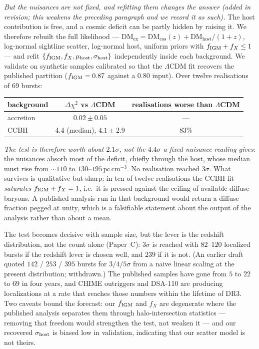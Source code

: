 \documentclass[11pt]{article}
\begin{document}
\emph{But the nuisances are not fixed, and refitting them changes the answer (added in revision;
this weakens the preceding paragraph and we record it as such).} The host contribution is free, and
a cosmic deficit can be partly hidden by raising it. We therefore rebuilt the full likelihood ---
$\mathrm{DM_{ex}} = \mathrm{DM_{cos}}(z) + \mathrm{DM_{host}}/(1+z)$, log-normal sightline scatter,
log-normal host, uniform priors with $f_{\rm IGM}+f_X \leq 1$ --- and refit
$\{f_{\rm IGM}, f_X, \mu_{\rm host}, \sigma_{\rm host}\}$ independently inside each background. We
validate on synthetic samples calibrated so that the $\Lambda$CDM fit recovers the published
partition ($f_{\rm IGM} = 0.87$ against a $0.80$ input). Over twelve realisations of $69$ bursts:
\begin{center}
\begin{tabular}{lcc}
\hline
background & $\Delta\chi^2$ vs $\Lambda$CDM & realisations worse than $\Lambda$CDM \\
\hline
accretion & $0.02 \pm 0.05$ & --- \\
CCBH & $4.4$ (median), $4.1 \pm 2.9$ & $83\%$ \\
\hline
\end{tabular}
\end{center}
\emph{The test is therefore worth about $2.1\sigma$, not the $4.4\sigma$ a fixed-nuisance reading gives}: the nuisances absorb most of
the deficit, chiefly through the host, whose median must rise from $\sim\!110$ to
$130$--$195\,\mathrm{pc\,cm^{-3}}$. No realisation reached $3\sigma$. What survives is qualitative
but sharp: in ten of twelve realisations the CCBH fit \emph{saturates} $f_{\rm IGM}+f_X = 1$, i.e.\
it is pressed against the ceiling of available diffuse baryons. A published analysis run in that
background would return a diffuse fraction pegged at unity, which is a falsifiable statement about
the output of the analysis rather than about a mean.

The test becomes decisive with sample size, but the lever is the redshift distribution, not the count alone (Paper~C): $3\sigma$ is reached with $82$--$120$ localized bursts if the redshift lever is chosen well, and $239$ if it is not. (An earlier draft quoted $142$ / $253$ / $395$ bursts for $3/4/5\sigma$ from a naive linear scaling at the present distribution; withdrawn.) The published samples have gone
from $5$ to $22$ to $69$ in four years, and CHIME outriggers and DSA-110 are producing localizations
at a rate that reaches those numbers within the lifetime of DR3. Two caveats bound the forecast:
our $f_{\rm IGM}$ and $f_X$ are degenerate where the published analysis separates them through
halo-intersection statistics --- removing that freedom would strengthen the test, not weaken it ---
and our recovered $\sigma_{\rm host}$ is biased low in validation, indicating that our scatter model
is not theirs.
\end{document}
